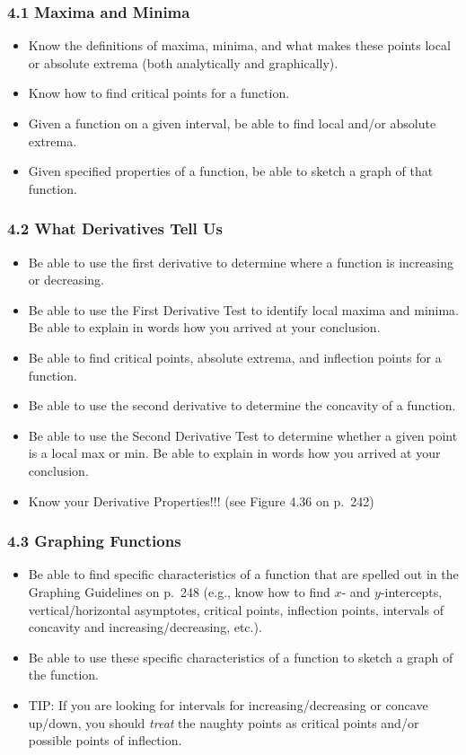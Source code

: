 \documentclass[14pt]{beamer}
\begin{document}
\begin{frame}
\frametitle{\small 4.1 Maxima and Minima}
\small
\begin{itemize}
\item Know the definitions of maxima, minima, and what makes these points local or absolute extrema (both analytically and graphically).
\item Know how to find critical points for a function.
\item Given a function on a given interval, be able to find local and/or absolute extrema.
\item Given specified properties of a function, be able to sketch a graph of that function.
\end{itemize}
\end{frame}

\begin{frame}
\frametitle{\small 4.2 What Derivatives Tell Us}
\footnotesize
\begin{itemize}
\item Be able to use the first derivative to determine where a function is increasing or decreasing.
\item Be able to use the \alert{First Derivative Test to identify local maxima and minima}.  Be able to explain in words how you arrived at your conclusion.
\item Be able to find critical points, absolute extrema, and inflection points for a function.
\item Be able to use the second derivative to determine the concavity of a function.
\item Be able to use the \alert{Second Derivative Test to determine whether a given point is a local max or min}.  Be able to explain in words how you arrived at your conclusion.
\item Know your Derivative Properties!!! (see Figure 4.36 on p.\ 242)
\end{itemize}
\end{frame}

\begin{frame}
\frametitle{\small 4.3 Graphing Functions}
\small
\begin{itemize}
\item Be able to find specific characteristics of a function that are spelled out in the Graphing Guidelines on p.\ 248 (e.g., know how to find $x$- and $y$-intercepts, vertical/horizontal asymptotes, critical points, inflection points, intervals of concavity and increasing/decreasing, etc.).  
\item Be able to use these specific characteristics of a function to sketch a graph of the function.
\item TIP: If you are looking for intervals for increasing/decreasing or concave up/down, you should {\it treat} the naughty points as critical points and/or possible points of inflection.
\end{itemize} 
\end{frame}
\end{document}
